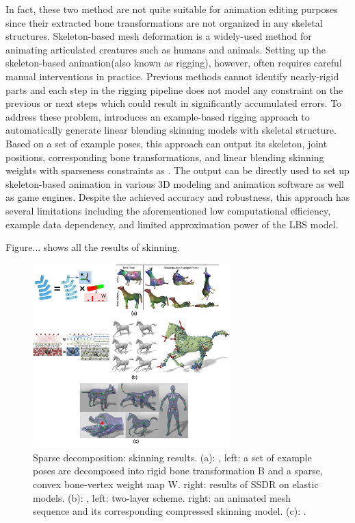 In fact, these two method are not quite suitable for animation editing purposes since their extracted bone transformations are not organized in any skeletal structures. Skeleton-based mesh deformation is a widely-used method for animating articulated creatures such as humans and animals. Setting up the skeleton-based animation(also known as rigging), however, often requires careful manual interventions in practice. Previous methods cannot identify nearly-rigid parts and each step in the rigging pipeline does not model any constraint on the previous or next steps which could result in significantly accumulated errors. To address these problem, \cite{le2014ras} introduces an example-based rigging approach to automatically generate linear blending skinning models with skeletal structure. Based on a set of example poses, this approach can output its skeleton, joint positions, corresponding bone transformations, and linear blending skinning weights with sparseness constraints as \cite{le2012smooth}. The output can be directly used to set up skeleton-based animation in various 3D modeling and animation software as well as game engines. Despite the achieved accuracy and robustness, this approach has several limitations including the aforementioned low computational efficiency, example data dependency, and limited approximation power of the LBS model.

Figure... shows all the results of skinning.


\begin{figure}[ht]
  \centering
  \includegraphics[width=3in]{images/skinning_decomposition}
  \caption{Sparse decomposition: skinning results. (a): \cite{le2012smooth}, left: a set of example poses are decomposed into rigid bone transformation B and a sparse, convex bone-vertex weight map W. right: results of SSDR on elastic models. (b): \cite{le2013two}, left: two-layer scheme. right: an animated mesh sequence and its corresponding compressed skinning model. (c): \cite{le2014ras}.}
\end{figure}


